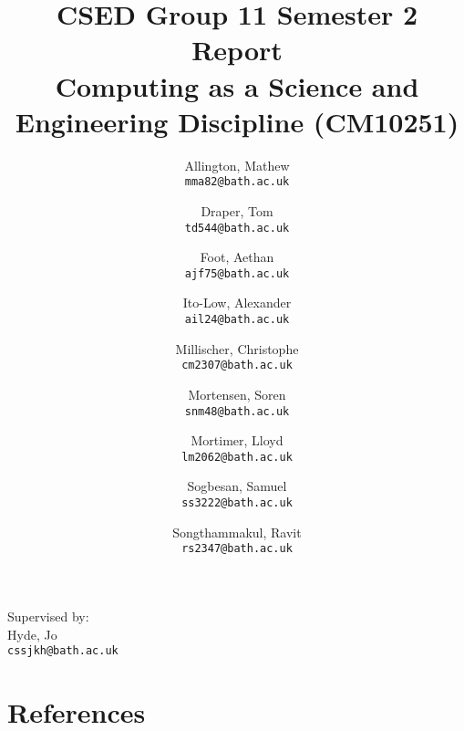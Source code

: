 \documentclass[a4paper,10pt]{article}
\title{%
  CSED Group 11 Semester 2 Report \\
  \vspace{0.5em}
  \Large Computing as a Science and Engineering Discipline (CM10251)
}
\author{%
  Allington, Mathew \\
  \texttt{mma82@bath.ac.uk}
  \and
  Draper, Tom \\
  \texttt{td544@bath.ac.uk}
  \and
  Foot, Aethan \\
  \texttt{ajf75@bath.ac.uk}
  \and
  Ito-Low, Alexander \\
  \texttt{ail24@bath.ac.uk}
  \and
  Millischer, Christophe \\
  \texttt{cm2307@bath.ac.uk}
  \and
  Mortensen, Soren \\
  \texttt{snm48@bath.ac.uk}
  \and
  Mortimer, Lloyd \\
  \texttt{lm2062@bath.ac.uk}
  \and
  Sogbesan, Samuel \\
  \texttt{ss3222@bath.ac.uk}
  \and
  Songthammakul, Ravit \\
  \texttt{rs2347@bath.ac.uk}
}
\date{}
\newcounter{reqsec}
\newcounter{req}[reqsec]
\begin{document}
\maketitle
\begin{abstract}
\end{abstract}

\vfill

\begin{center}
  \large Supervised by: \\
  \vspace{0.5em}
  Hyde, Jo \\
  \texttt{cssjkh@bath.ac.uk}
\end{center}

\newpage
\tableofcontents

\newpage


% 
% 

\section{References}
\newrefcontext[sorting=nyt]
\printbibliography[heading=none]

% 

%   
%   
%   
\end{document}
